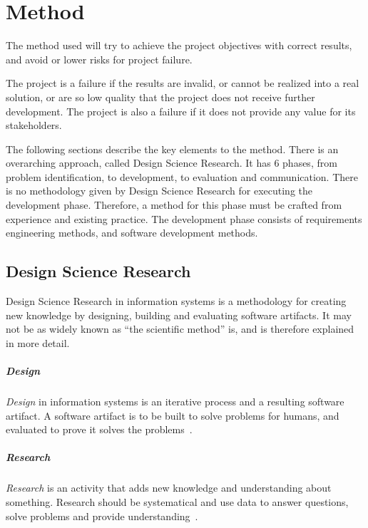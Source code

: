 \chapter{Method}\label{chap:method}

The method used will try to achieve the project objectives with correct results, and avoid or lower risks for project failure.


The project is a failure if the results are invalid, or cannot be realized into a real solution, or are so low quality that the project does not receive further development.
The project is also a failure if it does not provide any value for its stakeholders.


The following sections describe the key elements to the method.
There is an overarching approach, called Design Science Research.
It has 6 phases, from problem identification, to development, to evaluation and communication.
There is no methodology given by Design Science Research for executing the development phase.
Therefore, a method for this phase must be crafted from experience and existing practice.
The development phase consists of requirements engineering methods, and software development methods.

\section{Design Science Research}

Design Science Research in information systems is a methodology for creating new knowledge by designing, building and evaluating software \glspl{artifact}.
It may not be as widely known as ``the scientific method'' is, and is therefore explained in more detail.

\paragraph{Design}
\textit{Design} in information systems is an iterative process and a resulting software artifact. A software artifact is to be built to solve problems for humans, and evaluated to prove it solves the problems~\cite[p.~2]{alanhevnerDesignResearchInformation2010}.


\paragraph{Research}
\textit{Research} is an activity that adds new knowledge and understanding about something.
Research should be systematical and use data to answer questions, solve problems and provide understanding~\cite[p.~2,3]{alanhevnerDesignResearchInformation2010}.


